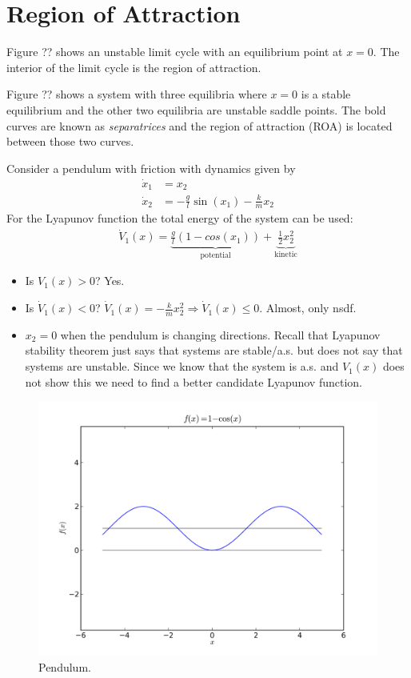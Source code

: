 \section{Region of Attraction}
Figure ?? shows an unstable limit cycle with an equilibrium point at $x=0$. The interior of the limit cycle is the region of attraction.

Figure ?? shows a system with three equilibria where $x=0$ is a stable equilibrium and the other two equilibria are unstable saddle points. The bold curves are known as \textit{separatrices} and the region of attraction (ROA) is located between those two curves.

\begin{example}
Consider a pendulum with friction with dynamics given by
\begin{align*}
\dot{x}_1 &= x_2 \\
\dot{x}_2 &= -\tfrac{g}{l}\sin(x_1) - \tfrac{k}{m}x_2
\end{align*}
For the Lyapunov function the total energy of the system can be used:
\begin{align*}
\dot{V}_1(x) = \underbrace{\tfrac{g}{l}(1-cos(x_1))}_{\text{potential}} + \underbrace{\tfrac{1}{2}x_2^2}_{\text{kinetic}}
\end{align*}
\begin{itemize}
\item Is $V_1(x)>0$? Yes.
\item Is $\dot{V}_1(x)<0$? $\dot{V}_1(x) = -\tfrac{k}{m}x_2^2 \Rightarrow \dot{V}_1(x)\leq0$. Almost, only nsdf.
\item $x_2=0$ when the pendulum is changing directions. Recall that Lyapunov stability theorem just says that systems are stable/a.s. but does not say that systems are unstable. Since we know that the system is a.s. and $V_1(x)$ does not show this we need to find a better candidate Lyapunov function.
\end{itemize}

\begin{figure}[ht!]
	\centering
	\includegraphics[width=.5\textwidth]{images/plot1minusCosX}
	\caption{Pendulum.}
	\label{fig:plot1minusCosX}
\end{figure}


\end{example}
